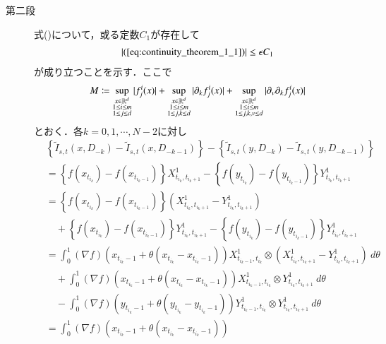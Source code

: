 \begin{prf}
\begin{description}
			\item[第二段]
				式()について，或る定数$C_1$が存在して
				\begin{align}
					|(\refeq{eq:continuity_theorem_1_1})| \leq \epsilon C_1
					\label{eq:continuity_theorem_1_3}
				\end{align}
				が成り立つことを示す．ここで
				\begin{align}
					M \coloneqq
						\operatorname*{sup}_{\substack{x \in \mathbb{R}^d \\ 1 \leq i \leq m \\ 1 \leq j \leq d}} |f^i_j(x)| 
						+ \operatorname*{sup}_{\substack{x \in \mathbb{R}^d \\ 1 \leq i \leq m \\ 1 \leq j,k \leq d}} |\partial_k f^i_j(x)|
						+ \operatorname*{sup}_{\substack{x \in \mathbb{R}^d \\ 1 \leq i \leq m \\ 1 \leq j,k,v \leq d}} |\partial_v \partial_k f^i_j(x)|
				\end{align}
				とおく．各$k = 0,1,\cdots,N-2$に対し
				\begin{align}
					&\left\{ \tilde{I}_{s,t}(x,D_{-k}) - \tilde{I}_{s,t}(x,D_{-k-1}) \right\} - 
						\left\{ \tilde{I}_{s,t}(y,D_{-k}) - \tilde{I}_{s,t}(y,D_{-k-1}) \right\} \\
					&=	\left\{ f(x_{t_{i_k}}) - f(x_{t_{i_k-1}}) \right\} X^1_{t_{i_k},t_{i_k+1}}
						- \left\{ f(y_{t_{i_k}}) - f(y_{t_{i_k-1}}) \right\} Y^1_{t_{i_k},t_{i_k+1}} \\
					&= \left\{ f(x_{t_{i_k}}) - f(x_{t_{i_k-1}}) \right\} \left( X^1_{t_{i_k},t_{i_k+1}} - Y^1_{t_{i_k},t_{i_k+1}} \right) \\
						&\quad +\left\{ f(x_{t_{i_k}}) - f(x_{t_{i_k-1}}) \right\} Y^1_{t_{i_k},t_{i_k+1}} - \left\{ f(y_{t_{i_k}}) - f(y_{t_{i_k-1}}) \right\} Y^1_{t_{i_k},t_{i_k+1}} \\
					&= \int_0^1 (\nabla f)( x_{t_{i_k}-1}+\theta ( x_{t_{i_k}}-x_{t_{i_k}-1} ))
						X^1_{t_{i_k-1},t_{i_k}} \otimes \left( X^1_{t_{i_k},t_{i_k+1}} - Y^1_{t_{i_k},t_{i_k+1}} \right)\ d\theta \\
						&\quad + \int_0^1 (\nabla f)( x_{t_{i_k}-1}+\theta ( x_{t_{i_k}}-x_{t_{i_k}-1} ))
						X^1_{t_{i_k-1},t_{i_k}} \otimes Y^1_{t_{i_k},t_{i_k+1}}\ d\theta \\
						&\quad - \int_0^1 (\nabla f)( y_{t_{i_k}-1}+\theta ( y_{t_{i_k}}-y_{t_{i_k}-1} ))
						Y^1_{t_{i_k-1},t_{i_k}} \otimes Y^1_{t_{i_k},t_{i_k+1}}\ d\theta \\
					&= \int_0^1 (\nabla f)( x_{t_{i_k}-1}+\theta ( x_{t_{i_k}}-x_{t_{i_k}-1} ))

\end{align}
\end{description}
\end{prf}
